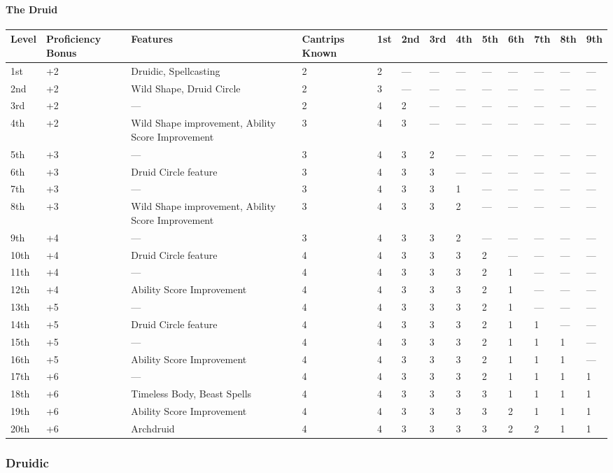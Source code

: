 \documentclass[
]{article}
\begin{document}
\hypertarget{the-druid}{%
\paragraph{The Druid}\label{the-druid}}

\begin{longtable}[]{@{}lllllllllllll@{}}
\toprule
Level & Proficiency Bonus & Features & Cantrips Known & 1st & 2nd & 3rd
& 4th & 5th & 6th & 7th & 8th & 9th\tabularnewline
\midrule
\endhead
1st & +2 & Druidic, Spellcasting & 2 & 2 & --- & --- & --- & --- & --- &
--- & --- & ---\tabularnewline
2nd & +2 & Wild Shape, Druid Circle & 2 & 3 & --- & --- & --- & --- &
--- & --- & --- & ---\tabularnewline
3rd & +2 & --- & 2 & 4 & 2 & --- & --- & --- & --- & --- & --- &
---\tabularnewline
4th & +2 & Wild Shape improvement, Ability Score Improvement & 3 & 4 & 3
& --- & --- & --- & --- & --- & --- & ---\tabularnewline
5th & +3 & --- & 3 & 4 & 3 & 2 & --- & --- & --- & --- & --- &
---\tabularnewline
6th & +3 & Druid Circle feature & 3 & 4 & 3 & 3 & --- & --- & --- & ---
& --- & ---\tabularnewline
7th & +3 & --- & 3 & 4 & 3 & 3 & 1 & --- & --- & --- & --- &
---\tabularnewline
8th & +3 & Wild Shape improvement, Ability Score Improvement & 3 & 4 & 3
& 3 & 2 & --- & --- & --- & --- & ---\tabularnewline
9th & +4 & --- & 3 & 4 & 3 & 3 & 2 & --- & --- & --- & --- &
---\tabularnewline
10th & +4 & Druid Circle feature & 4 & 4 & 3 & 3 & 3 & 2 & --- & --- &
--- & ---\tabularnewline
11th & +4 & --- & 4 & 4 & 3 & 3 & 3 & 2 & 1 & --- & --- &
---\tabularnewline
12th & +4 & Ability Score Improvement & 4 & 4 & 3 & 3 & 3 & 2 & 1 & ---
& --- & ---\tabularnewline
13th & +5 & --- & 4 & 4 & 3 & 3 & 3 & 2 & 1 & --- & --- &
---\tabularnewline
14th & +5 & Druid Circle feature & 4 & 4 & 3 & 3 & 3 & 2 & 1 & 1 & --- &
---\tabularnewline
15th & +5 & --- & 4 & 4 & 3 & 3 & 3 & 2 & 1 & 1 & 1 & ---\tabularnewline
16th & +5 & Ability Score Improvement & 4 & 4 & 3 & 3 & 3 & 2 & 1 & 1 &
1 & ---\tabularnewline
17th & +6 & --- & 4 & 4 & 3 & 3 & 3 & 2 & 1 & 1 & 1 & 1\tabularnewline
18th & +6 & Timeless Body, Beast Spells & 4 & 4 & 3 & 3 & 3 & 3 & 1 & 1
& 1 & 1\tabularnewline
19th & +6 & Ability Score Improvement & 4 & 4 & 3 & 3 & 3 & 3 & 2 & 1 &
1 & 1\tabularnewline
20th & +6 & Archdruid & 4 & 4 & 3 & 3 & 3 & 3 & 2 & 2 & 1 &
1\tabularnewline
\bottomrule
\end{longtable}

\hypertarget{druidic}{%
\subsubsection{Druidic}\label{druidic}}
\end{document}
